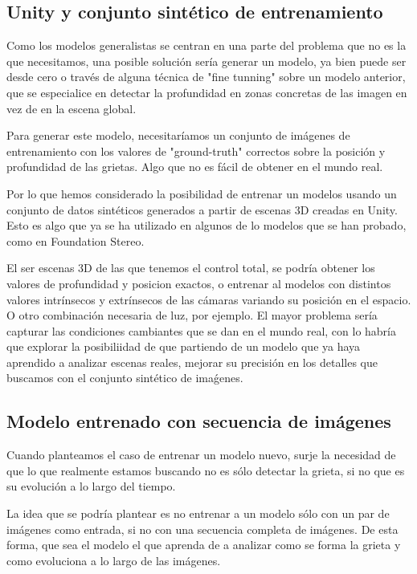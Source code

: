 \subsection{Unity y conjunto sintético de entrenamiento}
Como los modelos generalistas se centran en una parte del problema que no es la que necesitamos, una posible solución sería generar un modelo, ya bien puede ser desde cero o través de alguna técnica de "fine tunning" sobre un modelo anterior, que se especialice en detectar la profundidad en zonas concretas de las imagen en vez de en la escena global.

Para generar este modelo, necesitaríamos un conjunto de imágenes de entrenamiento con los valores de "ground-truth" correctos sobre la posición y profundidad de las grietas. Algo que no es fácil de obtener en el mundo real.

Por lo que hemos considerado la posibilidad de entrenar un modelos usando un conjunto de datos sintéticos generados a partir de escenas 3D creadas en Unity. Esto es algo que ya se ha utilizado en algunos de lo modelos que se han probado, como en Foundation Stereo.

El ser escenas 3D de las que tenemos el control total, se podría obtener los valores de profundidad y posicion exactos, o entrenar al modelos con distintos valores intrínsecos y extrínsecos de las cámaras variando su posición en el espacio. O otro combinación necesaria de luz, por ejemplo. El mayor problema sería capturar las condiciones cambiantes que se dan en el mundo real, con lo habría que explorar la posibiliidad de que partiendo de un modelo que ya haya aprendido a analizar escenas reales, mejorar su precisión en los detalles que buscamos con el conjunto sintético de imaǵenes.




\subsection{Modelo entrenado con secuencia de imágenes}
Cuando planteamos el caso de entrenar un modelo nuevo, surje la necesidad de que lo que realmente estamos buscando no es sólo detectar la grieta, si no que es su evolución a lo largo del tiempo.

La idea que se podría plantear es no entrenar a un modelo sólo con un par de imágenes como entrada, si no con una secuencia completa de imágenes. De esta forma, que sea el modelo el que aprenda de a analizar como se forma la grieta y como evoluciona a lo largo de las imágenes.

